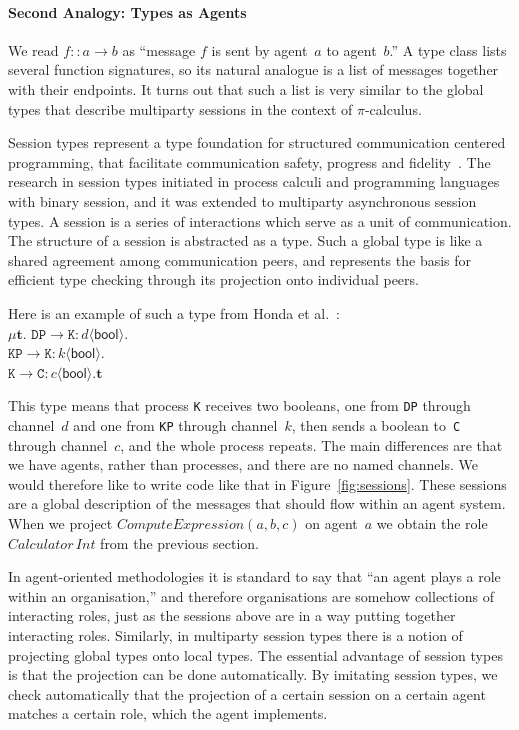 \documentclass[a4paper,12pt,oneside,fleqn]{book} %
\begin{document}
{\def\l#1->#2:#3<#4>{\mathtt{#1}\to\mathtt{#2}:#3\langle\mathsf{#4}\rangle}
\paragraph{Second Analogy: Types as Agents} We read $f::a\to b$ as
``message $f$ is sent by agent~$a$ to agent~$b$.'' A type class lists
several function signatures, so its natural analogue is a list of messages
together with their endpoints. It turns out that such a list is very
similar to the global types that describe multiparty sessions in the
context of $\pi$-calculus.

Session types represent a type foundation for structured communication
centered programming, that facilitate communication safety, progress and
fidelity~\cite{dblp:conf/popl/hondayc08}. The research in session types
initiated in process calculi and programming languages with binary session,
and it was extended to multiparty asynchronous session types. A session is
a series of interactions which serve as a unit of communication. The
structure of a session is abstracted as a type. Such a global type is like
a shared agreement among communication peers, and represents the basis for
efficient type checking through its projection onto individual peers.



Here is an example of such a type from
Honda et al.~\cite{dblp:conf/popl/hondayc08}:\\
$\mu\mathbf{t}.$
  $\l DP->K:d<bool>. $\\
  $\l KP->K:k<bool>. $\\
  $\l K->C:c<bool>.\mathbf{t}$

This type means that process \texttt{K} receives two booleans, one from
\texttt{DP} through channel~$d$ and one from \texttt{KP} through channel~$k$,
then sends a boolean to~\texttt{C} through channel~$c$, and the whole process
repeats. The main differences are that we have agents, rather than processes,
and there are no named channels. We would therefore like to write code like
that in Figure~\ref{fig:sessions}.  These sessions are a global description of
the messages that should flow within an agent system. When we project
$\mathit{ComputeExpression}(a,b,c)$ on agent~$a$ we obtain the role
$\mathit{Calculator}\,\mathit{Int}$ from the previous section.}

In agent-oriented methodologies it is standard to say that ``an agent plays
a role within an organisation,'' and therefore organisations are somehow
collections of interacting roles, just as the sessions above are in a way
putting together interacting roles. Similarly, in multiparty session types
there is a notion of projecting global types onto local types. The
essential advantage of session types is that the projection can be done
automatically. By imitating session types, we check automatically that the
projection of a certain session on a certain agent matches a certain role,
which the agent implements.
\end{document}
